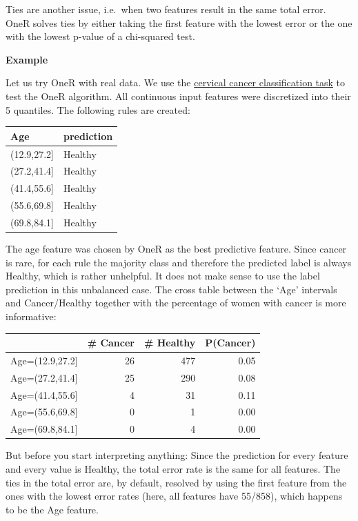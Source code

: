 \documentclass[
  10pt,
]{scrbook}
\begin{document}
Ties are another issue, i.e.~when two features result in the same total error.
OneR solves ties by either taking the first feature with the lowest error or the one with the lowest p-value of a chi-squared test.

\textbf{Example}

Let us try OneR with real data.
We use the \protect\hyperlink{cervical}{cervical cancer classification task} to test the OneR algorithm.
All continuous input features were discretized into their 5 quantiles.
The following rules are created:

\begin{table}
\centering
\begin{tabular}{ll}
\toprule
Age & prediction\\
\midrule
(12.9,27.2] & Healthy\\
(27.2,41.4] & Healthy\\
(41.4,55.6] & Healthy\\
(55.6,69.8] & Healthy\\
(69.8,84.1] & Healthy\\
\bottomrule
\end{tabular}
\end{table}

The age feature was chosen by OneR as the best predictive feature.
Since cancer is rare, for each rule the majority class and therefore the predicted label is always Healthy, which is rather unhelpful.
It does not make sense to use the label prediction in this unbalanced case.
The cross table between the `Age' intervals and Cancer/Healthy together with the percentage of women with cancer is more informative:

\begin{table}
\centering
\begin{tabular}{lrrr}
\toprule
  & \# Cancer & \# Healthy & P(Cancer)\\
\midrule
Age=(12.9,27.2] & 26 & 477 & 0.05\\
Age=(27.2,41.4] & 25 & 290 & 0.08\\
Age=(41.4,55.6] & 4 & 31 & 0.11\\
Age=(55.6,69.8] & 0 & 1 & 0.00\\
Age=(69.8,84.1] & 0 & 4 & 0.00\\
\bottomrule
\end{tabular}
\end{table}

But before you start interpreting anything:
Since the prediction for every feature and every value is Healthy, the total error rate is the same for all features.
The ties in the total error are, by default, resolved by using the first feature from the ones with the lowest error rates (here, all features have 55/858), which happens to be the Age feature.
\end{document}
